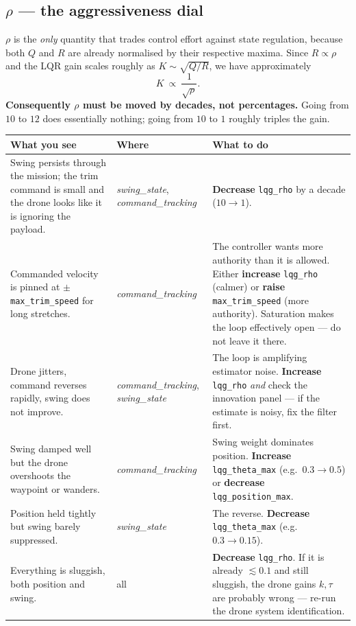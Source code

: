 \documentclass[11pt,a4paper]{article}
\newcommand{\param}[1]{\texttt{\small #1}}
\newcommand{\plot}[1]{\textit{#1}}
\begin{document}
\subsection{$\rho$ --- the aggressiveness dial}

$\rho$ is the \emph{only} quantity that trades control effort against state
regulation, because both $Q$ and $R$ are already normalised by their respective
maxima. Since $R\propto\rho$ and the LQR gain scales roughly as
$K\sim\sqrt{Q/R}$, we have approximately
%
\begin{equation}
K \ \propto\ \frac{1}{\sqrt{\rho}}.
\end{equation}
%
\textbf{Consequently $\rho$ must be moved by decades, not percentages.} Going
from $10$ to $12$ does essentially nothing; going from $10$ to $1$ roughly
triples the gain.

\begin{center}
\begin{longtable}{@{}p{6.6cm}p{3.0cm}p{5.4cm}@{}}
\toprule
\textbf{What you see} & \textbf{Where} & \textbf{What to do} \\
\midrule
\endhead
Swing persists through the mission; the trim command is small and the drone
looks like it is ignoring the payload.
& \plot{swing\_state}, \plot{command\_tracking}
& \textbf{Decrease} \param{lqg\_rho} by a decade ($10\rightarrow1$). \\

Commanded velocity is pinned at $\pm$\param{max\_trim\_speed} for long stretches.
& \plot{command\_tracking}
& The controller wants more authority than it is allowed. Either
\textbf{increase} \param{lqg\_rho} (calmer) or \textbf{raise}
\param{max\_trim\_speed} (more authority). Saturation makes the loop
effectively open --- do not leave it there. \\

Drone jitters, command reverses rapidly, swing does not improve.
& \plot{command\_tracking}, \plot{swing\_state}
& The loop is amplifying estimator noise. \textbf{Increase} \param{lqg\_rho}
\emph{and} check the innovation panel --- if the estimate is noisy, fix the
filter first. \\

Swing damped well but the drone overshoots the waypoint or wanders.
& \plot{command\_tracking}
& Swing weight dominates position. \textbf{Increase} \param{lqg\_theta\_max}
(e.g.\ $0.3\rightarrow0.5$) or \textbf{decrease} \param{lqg\_position\_max}. \\

Position held tightly but swing barely suppressed.
& \plot{swing\_state}
& The reverse. \textbf{Decrease} \param{lqg\_theta\_max} (e.g.\
$0.3\rightarrow0.15$). \\

Everything is sluggish, both position and swing.
& all
& \textbf{Decrease} \param{lqg\_rho}. If it is already $\lesssim0.1$ and still
sluggish, the drone gains $k,\tau$ are probably wrong --- re-run the drone
system identification. \\
\bottomrule
\end{longtable}
\end{center}
\end{document}
